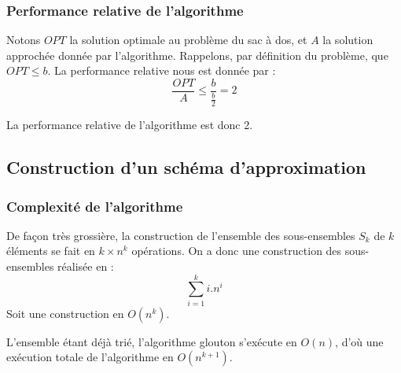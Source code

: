 \subsubsection{Performance relative de l'algorithme}

Notons $OPT$ la solution optimale au problème du sac à dos, et $A$ la solution approchée donnée par
l'algorithme. Rappelons, par définition du problème, que $OPT \leq b $. La performance relative nous
est donnée par : $$
\frac{OPT}{A} \leq \frac{b}{\frac{b}{2}} = 2 $$

La performance relative de l'algorithme est donc 2.

\subsection{Construction d'un schéma d'approximation}

\subsubsection{Complexité de l'algorithme}

De façon très grossière, la construction de l'ensemble des sous-ensembles $S_k$ de $k$ éléments se
fait en $k\times n^k$ opérations. On a donc une construction des sous-ensembles réalisée en : 
$$\sum_{i=1}^k i . n^i $$
Soit une construction en $O(n^k)$.

L'ensemble étant déjà trié, l'algorithme glouton s'exécute en $O(n)$, d'où une exécution totale de
l'algorithme en $O(n^{k+1})$.


